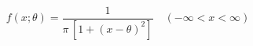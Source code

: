 \documentclass[preview]{standalone}
\begin{document}
\begin{align*}
f(x; \theta )=\dfrac{1}{\pi\,[1+(x- \theta )^2]} \quad(-\infty<x<\infty)
\end{align*}
\end{document}
